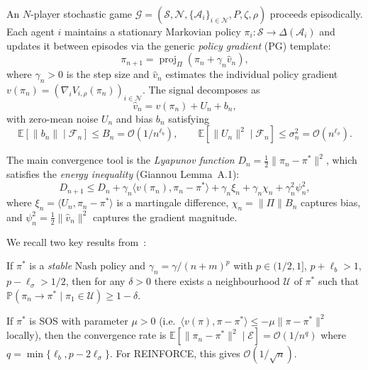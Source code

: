An $N$-player stochastic game $\mathcal{G} = (\mathcal{S}, \mathcal{N}, \{\mathcal{A}_i\}_{i \in \mathcal{N}}, P, \zeta, \rho)$ proceeds episodically. Each agent $i$ maintains a stationary Markovian policy $\pi_i : \mathcal{S} \to \Delta(\mathcal{A}_i)$ and updates it between episodes via the generic \emph{policy gradient} (PG) template:
\begin{equation}
\label{eq:pg-generic}
\tag{PG}
    \pi_{n+1} = \operatorname{proj}_\Pi(\pi_n + \gamma_n \hat{v}_n),
\end{equation}
where $\gamma_n > 0$ is the step size and $\hat{v}_n$ estimates the individual policy gradient $v(\pi_n) = (\nabla_i V_{i,\rho}(\pi_n))_{i \in \mathcal{N}}$. The signal decomposes as
\begin{equation}
\label{eq:signal-decomp-ch7}
    \hat{v}_n = v(\pi_n) + U_n + b_n,
\end{equation}
with zero-mean noise $U_n$ and bias $b_n$ satisfying
\begin{equation}
\label{eq:bias-var-ch7}
    \mathbb{E}[\|b_n\| \mid \mathcal{F}_n] \leq B_n = \mathcal{O}(1/n^{\ell_b}), \qquad \mathbb{E}[\|U_n\|^2 \mid \mathcal{F}_n] \leq \sigma_n^2 = \mathcal{O}(n^{\ell_\sigma}).
\end{equation}

The main convergence tool is the \emph{Lyapunov function} $D_n = \frac{1}{2}\|\pi_n - \pi^*\|^2$, which satisfies the \emph{energy inequality} (Giannou Lemma~A.1):
\begin{equation}
\label{eq:energy-ch7}
    D_{n+1} \leq D_n + \gamma_n \langle v(\pi_n), \pi_n - \pi^* \rangle + \gamma_n \xi_n + \gamma_n \chi_n + \gamma_n^2 \psi_n^2,
\end{equation}
where $\xi_n = \langle U_n, \pi_n - \pi^* \rangle$ is a martingale difference, $\chi_n = \|\Pi\| B_n$ captures bias, and $\psi_n^2 = \frac{1}{2}\|\hat{v}_n\|^2$ captures the gradient magnitude.

We recall two key results from~\cite{giannou2022}:

\begin{theorem}
\label{thm:giannou1-ch7}
If $\pi^*$ is a \emph{stable} Nash policy and $\gamma_n = \gamma/(n+m)^p$ with $p \in (1/2, 1]$, $p + \ell_b > 1$, $p - \ell_\sigma > 1/2$, then for any $\delta > 0$ there exists a neighbourhood $\mathcal{U}$ of $\pi^*$ such that $\mathbb{P}(\pi_n \to \pi^* \mid \pi_1 \in \mathcal{U}) \geq 1 - \delta$.
\end{theorem}

\begin{theorem}
\label{thm:giannou2-ch7}
If $\pi^*$ is SOS with parameter $\mu > 0$ (i.e.\ $\langle v(\pi), \pi - \pi^* \rangle \leq -\mu\|\pi - \pi^*\|^2$ locally), then the convergence rate is $\mathbb{E}[\|\pi_n - \pi^*\|^2 \mid \mathcal{E}] = \mathcal{O}(1/n^q)$ where $q = \min\{\ell_b, p - 2\ell_\sigma\}$. For REINFORCE, this gives $\mathcal{O}(1/\sqrt{n})$.
\end{theorem}


